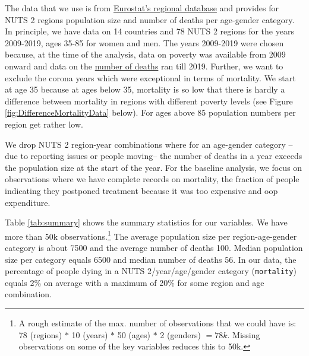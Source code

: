 \documentclass[a4paper,12pt]{article}
\begin{document}
The data that we use is from \href{https://ec.europa.eu/eurostat/web/regions/data/database}{Eurostat's regional database} and provides for NUTS 2 regions population size and number of deaths per age-gender category. In principle, we have data on 14 countries and 78 NUTS 2 regions for the years 2009-2019, ages 35-85 for women and men. The years 2009-2019 were chosen  because, at the time of the analysis, data on poverty was available from 2009 onward and data on the \href{https://ec.europa.eu/eurostat/databrowser/view/demo\_r\_magec/default/table?lang=en}{number of deaths} ran till 2019. Further, we want to exclude the corona years which were exceptional in terms of mortality. We start at age 35 because at ages below 35, mortality is so low that there is hardly a difference between mortality in regions with different poverty levels (see Figure \ref{fig:DifferenceMortalityData} below). For ages above 85 population numbers per region get rather low. 

We drop NUTS 2 region-year combinations where for an age-gender category --due to reporting issues or people moving-- the number of deaths in a year exceeds the population size at the start of the year. For the baseline analysis, we focus on observations where we have complete records on mortality, the fraction of people indicating they postponed treatment because it was too expensive and oop expenditure. 

Table \ref{tab:summary} shows the summary statistics for our variables. We have more than 50k observations.\footnote{A rough estimate of the max. number of observations that we could have is: 78 (regions) \(*\) 10 (years) \(*\) 50 (ages) \(*\) 2 (genders) \(=78k\). Missing observations on some of the key variables reduces this to 50k.} The average population size per region-age-gender category is about 7500 and the average number of deaths 100. Median population size per category equals 6500 and median number of deaths 56. In our data, the percentage of people dying in a NUTS 2/year/age/gender category (\texttt{mortality}) equals 2\% on average with a maximum of 20\% for some region and age combination.
\end{document}
